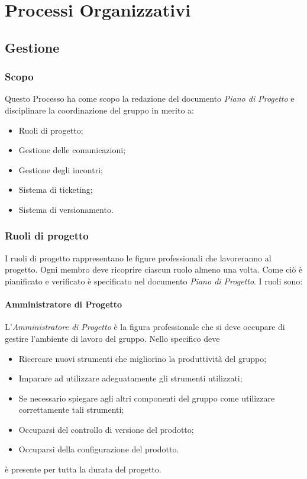 \section{Processi Organizzativi}


\subsection{Gestione}

	\subsubsection{Scopo}
	Questo Processo ha come scopo la redazione del documento \emph{Piano di Progetto} e disciplinare la coordinazione del gruppo in merito a:
	\begin{itemize}
		\item Ruoli di progetto;
		\item Gestione delle comunicazioni;
		\item Gestione degli incontri;
		\item Sistema di ticketing;
		\item Sistema di versionamento.
		
	\end{itemize}
	\subsubsection{Ruoli di progetto} 
	I ruoli di progetto rappresentano le figure professionali che lavoreranno al progetto.  Ogni membro deve ricoprire ciascun ruolo almeno una volta. Come ciò è pianificato e verificato è specificato nel documento \emph{Piano di Progetto}. I ruoli sono:
		\paragraph{Amministratore di Progetto} \Spazio
		L'\emph{Amministratore di Progetto} è la figura professionale che si deve occupare di gestire l'ambiente di lavoro del gruppo. Nello specifico deve
		\begin{itemize}
			\item Ricercare nuovi strumenti che migliorino la produttività del gruppo;
			\item Imparare ad utilizzare adeguatamente gli strumenti utilizzati;
			\item Se necessario spiegare agli altri componenti del gruppo come utilizzare correttamente tali strumenti;
			\item Occuparsi del controllo di versione del prodotto;
			\item Occuparsi della configurazione del prodotto.
		\end{itemize}
		è presente per tutta la durata del progetto.
